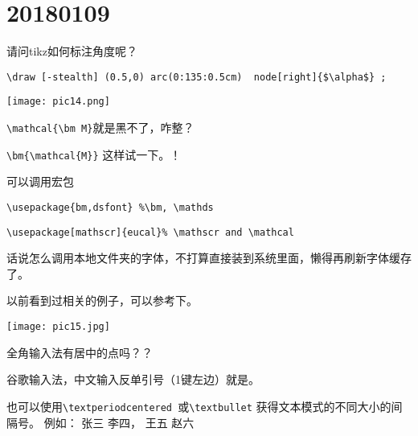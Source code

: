 \documentclass[QA.tex]{subfiles}
\begin{document}
%
%

\chapter{20180109}\label{ch180109}

\begin{qst}\label{Q2018010901}
请问tikz如何标注角度呢？
\end{qst}
\ans \verb|\draw [-stealth] (0.5,0) arc(0:135:0.5cm)  node[right]{$\alpha$} ;|

\texttt{[image: pic14.png]}

\begin{qst}\label{Q2018010902}
\verb|\mathcal{\bm M}|就是黑不了，咋整？
\end{qst}
\ans \verb|\bm{\mathcal{M}}| 这样试一下。！

可以调用宏包

\verb|\usepackage{bm,dsfont} %\bm, \mathds|

\verb|\usepackage[mathscr]{eucal}% \mathscr and \mathcal|

\begin{qst}\label{Q2018010903}
话说怎么调用本地文件夹的字体，不打算直接装到系统里面，懒得再刷新字体缓存了。
\end{qst}
\ans
以前看到过相关的例子，可以参考下。


\texttt{[image: pic15.jpg]}

\begin{qst}\label{Q2018010904}
全角输入法有居中的点吗？？
\end{qst}
\ans 谷歌输入法，中文输入反单引号（1键左边）就是。

也可以使用\verb|\textperiodcentered |或\verb|\textbullet| 获得文本模式的不同大小的间隔号。
例如：
张三 \textperiodcentered 李四， \quad
王五 \textbullet 赵六
\end{document}
